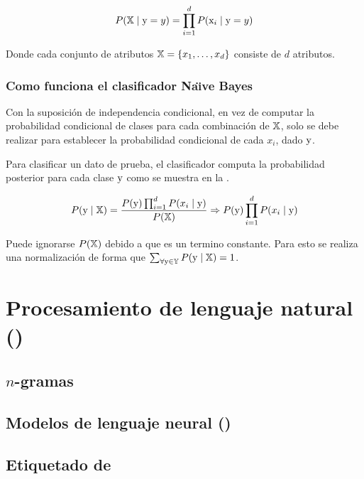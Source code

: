 \begin{equation} \label{eq:bayes-conditional-independence}
  P({\mathbb{X}}\mid{\textnormal{y}}=y) = \prod_{i=1}^{d} P({\textnormal{x}}_i\mid{\textnormal{y}}=y)
\end{equation}

Donde cada conjunto de atributos ${\mathbb{X}}=\{ x_1, \ldots, x_d \}$ consiste de $d$ atributos.
\subsubsection{Como funciona el clasificador Na\"{\i}ve Bayes}
Con la suposición de independencia condicional, en vez de computar la probabilidad condicional de clases para cada combinación de ${\mathbb{X}}$, solo se debe realizar para establecer la probabilidad condicional de cada $x_i$, dado ${\textnormal{y}}$.

Para clasificar un dato de prueba, el clasificador computa la probabilidad posterior para cada clase ${\textnormal{y}}$ como se muestra en la .

\begin{equation} \label{eq:bayes-classifier}
  P({\textnormal{y}}\mid {\mathbb{X}}) = \frac{P({\textnormal{y}}) \prod_{i=1}^{d}P(x_i\mid{\textnormal{y}})}{P({\mathbb{X}})} \Rightarrow P({\textnormal{y}}) \prod_{i=1}^{d}P(x_i\mid{\textnormal{y}})
\end{equation}

Puede ignorarse $P({\mathbb{X}})$ debido a que es un termino constante. Para esto se realiza una normalización de forma que $\sum_{\forall {\textnormal{y}} \in {\mathbb{Y}}} P({\textnormal{y}}\mid {\mathbb{X}}) = 1$.


\section{Procesamiento de lenguaje natural ()}

\subsection{$n$-gramas}

\subsection{Modelos de lenguaje neural ()}

\subsection{Etiquetado de }

